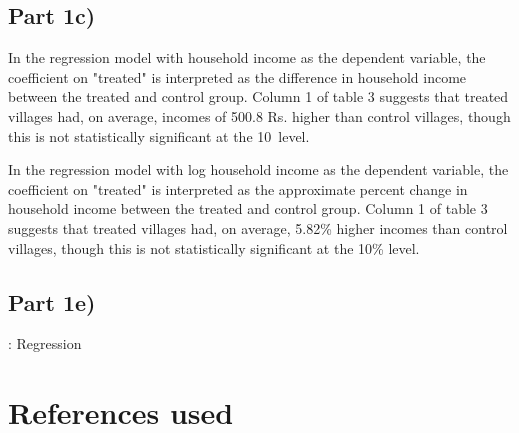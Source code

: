 \documentclass[12pt]{article}
\begin{document}
\subsection*{Part 1c)}

In the regression model with household income as the dependent variable, the coefficient on "treated" is interpreted as the difference in household income between the treated and control group. Column 1 of table 3 suggests that treated villages had, on average, incomes of 500.8 Rs. higher than control villages, though this is not statistically significant at the 10\ level.

In the regression model with log household income as the dependent variable, the coefficient on "treated" is interpreted as the approximate percent change in household income between the treated and control group. Column 1 of table 3 suggests that treated villages had, on average, 5.82\% higher incomes than control villages, though this is not statistically significant at the 10\% level.

\subsection*{Part 1e)}




\begin{table}[H]
    \centering
    \scriptsize %
    \setlength{\tabcolsep}{2pt}
    \renewcommand{\arraystretch}{0.8}
    \resizebox{\textwidth}{!}{}
    \caption{: Regression}
\end{table}





\section{References used}
\end{document}
